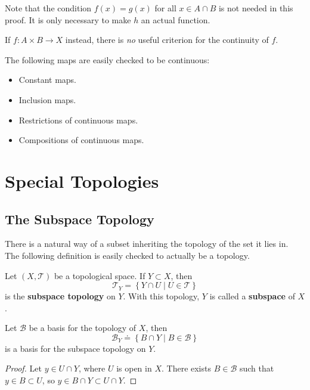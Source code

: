 \documentclass[twoside,10pt]{report}
\begin{document}
	Note that the condition $f(x) = g(x)$ for all $x \in A \cap B$ is not needed in this proof. It is only necessary to make $h$ an actual function.

\begin{note}
	If $f:A\times B\to X$ instead, there is \textit{no} useful criterion for the continuity of $f$.
\end{note}
The following maps are easily checked to be continuous:
\begin{itemize}
	\item Constant maps.
	\item Inclusion maps.
	\item Restrictions of continuous maps.
	\item Compositions of continuous maps.
\end{itemize}


\chapter{Special Topologies}



\section{The Subspace Topology}

There is a natural way of a subset inheriting the topology of the set it lies in. The following definition is easily checked to actually be a topology.

\begin{defn}
	Let $(X,\mathcal{T})$ be a topological space. If $Y \subset X$, then
	\[
	\mathcal{T}_Y = \left\{ Y \cap U \;|\; U \in \mathcal{T} \right\}
	\] is the \textbf{subspace topology} on $Y$. With this topology, $Y$ is called a \textbf{subspace} of $X$.
\end{defn}

\begin{prop}
Let $\mathcal{B}$ be a basis for the topology of $X$, then \[\mathcal{B}_Y \doteq \left\{ B \cap Y \;|\; B \in \mathcal{B} \right\}\] is a basis for the subspace topology on $Y$.
\end{prop}
\begin{proof}
	Let $y \in U \cap Y$, where $U$ is open in $X$. There exists $B \in \mathcal{B}$ such that $y \in B \subset U$, so $y \in B \cap Y \subset U \cap Y$.
\end{proof}
\end{document}
